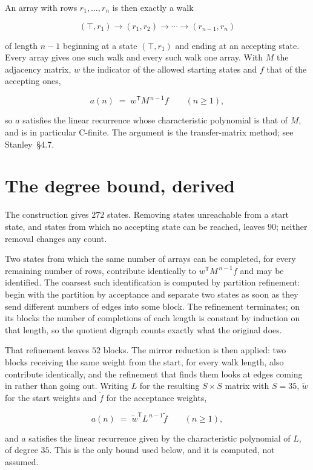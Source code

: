 \documentclass[11pt]{article}
\theoremstyle{definition}
\begin{document}
An array with rows $r_1,\dots,r_n$ is then exactly a walk

\[(\top,r_1) \to (r_1,r_2) \to \cdots \to (r_{n-1},r_n)\]

of length $n-1$ beginning at a state $(\top,r_1)$ and ending at an accepting state. Every array gives one such walk and every such walk one array. With $M$ the adjacency matrix, $w$ the indicator of the allowed starting states and $f$ that of the accepting ones,

\[a(n) \;=\; w^{\mathsf T} M^{\,n-1} f \qquad (n \ge 1),\]

so $a$ satisfies the linear recurrence whose characteristic polynomial is that of $M$, and is in particular C-finite. The argument is the transfer-matrix method; see Stanley~\S4.7.

\section{The degree bound, derived}

The construction gives $272$ states. Removing states unreachable from a start state, and states from which no accepting state can be reached, leaves $90$; neither removal changes any count.

Two states from which the same number of arrays can be completed, for every remaining number of rows, contribute identically to $w^{\mathsf T}M^{\,n-1}f$ and may be identified. The coarsest such identification is computed by partition refinement: begin with the partition by acceptance and separate two states as soon as they send different numbers of edges into some block. The refinement terminates; on its blocks the number of completions of each length is constant by induction on that length, so the quotient digraph counts exactly what the original does.

That refinement leaves $52$ blocks. The mirror reduction is then applied: two blocks receiving the same weight from the start, for every walk length, also contribute identically, and the refinement that finds them looks at edges coming in rather than going out. Writing $L$ for the resulting $S \times S$ matrix with $S = 35$, $\tilde w$ for the start weights and $\tilde f$ for the acceptance weights,

\[a(n) \;=\; \tilde w^{\mathsf T} L^{\,n-1} \tilde f \qquad (n \ge 1),\]

and $a$ satisfies the linear recurrence given by the characteristic polynomial of $L$, of degree $35$. This is the only bound used below, and it is computed, not assumed.
\end{document}
